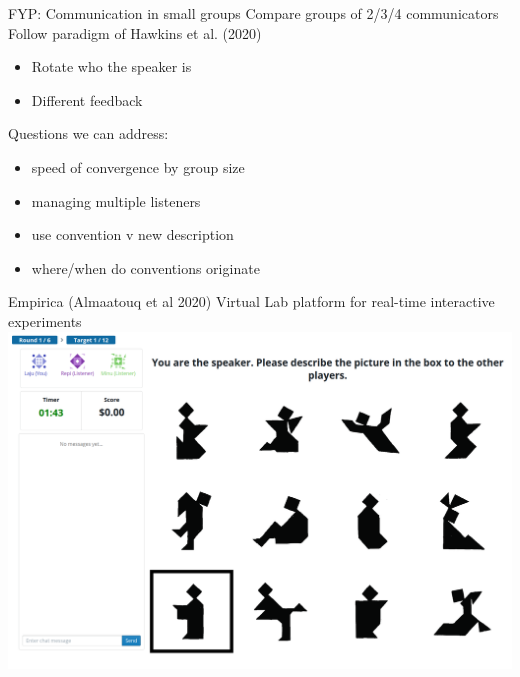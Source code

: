 \documentclass[ 12pt, xcolor=beamer,table,usenames,dvipsnames, ignorenonframetext, ngerman]{beamer}
\begin{document}
\begin{frame}{\large FYP: Communication in small groups}
	Compare groups of 2/3/4 communicators\\
	Follow paradigm of Hawkins et al. (2020)
	\begin{itemize}
		\item Rotate who the speaker is
		\item Different feedback
	\end{itemize} 
Questions we can address:
\begin{itemize}
	\item speed of convergence by group size
	\item managing multiple listeners
	\item use convention v new description
	\item where/when do conventions originate
\end{itemize}

\end{frame}

\begin{frame}{\large Empirica (Almaatouq et al 2020)}
Virtual Lab platform for real-time interactive experiments
 \includegraphics[width=\textwidth]{../images/interface.PNG}
\end{frame}
\end{document}
